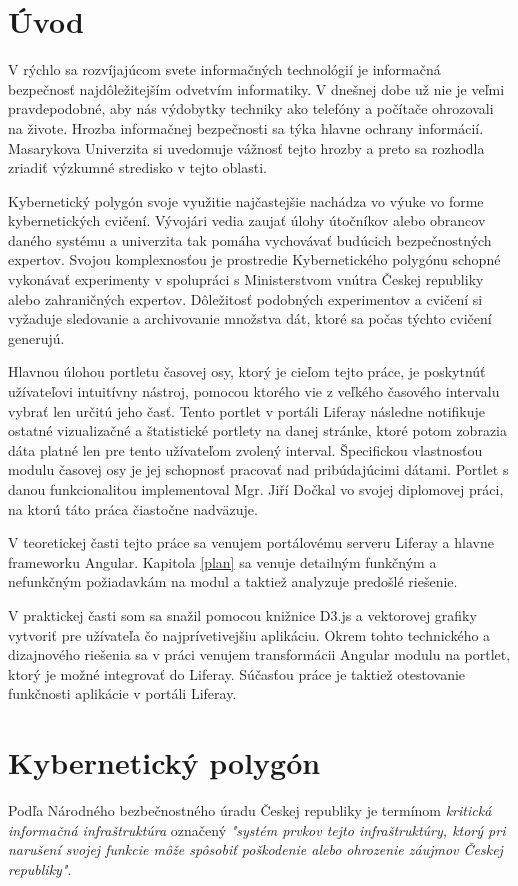 \documentclass[
  digital, %
  twoside, %
  notable,   %
  nolof,   %
  nolot,   %
]{fithesis3}
\begin{document}
\chapter*{Úvod}
V rýchlo sa rozvíjajúcom svete informačných technológií je informačná bezpečnosť najdôležitejším odvetvím informatiky. V dnešnej dobe už nie je veľmi pravdepodobné, aby nás výdobytky techniky ako telefóny a počítače ohrozovali na živote. Hrozba informačnej bezpečnosti sa týka hlavne ochrany informácií. Masarykova Univerzita si uvedomuje vážnosť tejto hrozby a preto sa rozhodla zriadiť výzkumné stredisko v tejto oblasti.

Kybernetický polygón svoje využitie najčastejšie nachádza vo výuke vo forme kybernetických cvičení. Vývojári vedia zaujať úlohy útočníkov alebo obrancov daného systému a univerzita tak pomáha vychovávať budúcich bezpečnostných expertov. Svojou komplexnosťou je prostredie Kybernetického polygónu schopné vykonávať experimenty v spolupráci s Ministerstvom vnútra Českej republiky alebo zahraničných expertov. Dôležitosť podobných experimentov a cvičení si vyžaduje sledovanie a archivovanie množstva dát, ktoré sa počas týchto cvičení generujú.

Hlavnou úlohou portletu časovej osy, ktorý je cieľom tejto práce, je poskytnúť užívateľovi intuitívny nástroj, pomocou ktorého vie z veľkého časového intervalu vybrať len určitú jeho časť. Tento portlet v portáli Liferay následne notifikuje ostatné vizualizačné a štatistické portlety na danej stránke, ktoré potom zobrazia dáta platné len pre tento užívateľom zvolený interval. Špecifickou vlastnosťou modulu časovej osy je jej schopnosť pracovať nad pribúdajúcimi dátami. Portlet s danou funkcionalitou implementoval Mgr. Jiří Dočkal vo svojej diplomovej práci, na ktorú táto práca čiastočne nadväzuje.

V teoretickej časti tejto práce sa venujem portálovému serveru Liferay a hlavne frameworku Angular. Kapitola \ref{plan} sa venuje detailným funkčným a nefunkčným požiadavkám na modul a taktiež analyzuje predošlé riešenie.

V praktickej časti som sa snažil pomocou knižnice D3.js a vektorovej grafiky vytvoriť pre užívateľa čo najprívetivejšiu aplikáciu. Okrem tohto technického a dizajnového riešenia sa v práci venujem transformácii Angular modulu na portlet, ktorý je možné integrovať do Liferay. Súčasťou práce je taktiež otestovanie funkčnosti aplikácie v portáli Liferay.

\chapter{Kybernetický polygón}
Podľa Národného bezbečnostného úradu Českej republiky je termínom \textit{kritická informačná infraštruktúra} označený \textit{"systém prvkov tejto infraštruktúry, ktorý pri narušení svojej funkcie môže spôsobiť poškodenie alebo ohrozenie záujmov Českej republiky"}\cite{nbu2012}.
\end{document}
